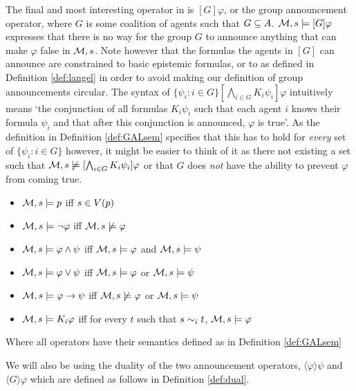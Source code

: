 The final and most interesting operator in  is $[G]\varphi$, or the group announcement operator, where $G$ is some coalition of agents such that $G \subseteq A$. $\mathcal{M},s \models [G]\varphi$ expresses that there is no way for the group $G$ to announce anything that can make $\varphi$ false in $\mathcal{M},s$. Note however that the formulas the agents in $[G]$ can announce are constrained to basic epistemic formulas, or to  as defined in Definition \ref{def:langel} in order to avoid making our definition of group announcements circular.  The syntax of $\{\psi_i: i\in G\}[\bigwedge_{i\in G}K_i\psi_i]\varphi$ intuitively means `the conjunction of all formulas $K_i\psi_i$ such that each agent $i$ knows their formula $\psi_i$ and that after this conjunction is announced, $\varphi$ is true'. As the definition in Definition \ref{def:GALsem} specifies that this has to hold for \textit{every} set of $\{\psi_i : i\in G\}$ however, it might be easier to think of it as there not existing a set such that $\mathcal{M},s \not\models [\bigwedge_{i\in G}K_i\psi_i]\varphi$ or that $G$ does \textit{not} have the ability to prevent $\varphi$ from coming true.

\begin{definition} \hfill
	\label{def:langel}
	\begin{itemize}
		\item[] $\mathcal{M},s \models p $ iff $ s \in V(p)$
		\item[] $\mathcal{M},s \models \neg\varphi$ iff $ \mathcal{M},s \not\models \varphi$
		\item[] $\mathcal{M},s \models \varphi \wedge \psi $ iff $ \mathcal{M},s \models \varphi $ and $ \mathcal{M},s \models \psi$
		\item[] $\mathcal{M},s \models \varphi \vee \psi $ iff $ \mathcal{M},s \models \varphi $ or $ \mathcal{M},s \models \psi$
		\item[] $\mathcal{M},s \models \varphi \rightarrow \psi $ iff $ \mathcal{M},s \not\models \varphi $ or $ \mathcal{M},s \models \psi$
		\item[] $\mathcal{M},s \models K_i\varphi $ iff for every $t$ such that $s\sim_{i}t$, $\mathcal{M},s \models \varphi$
	\end{itemize}
	Where all operators have their semantics defined as in Definition \ref{def:GALsem}
\end{definition}

We will also be using the duality of the two announcement operators, $\langle\varphi\rangle\psi$ and $\langle G\rangle\varphi$ which are defined as follows in Definition \ref{def:dual}.

